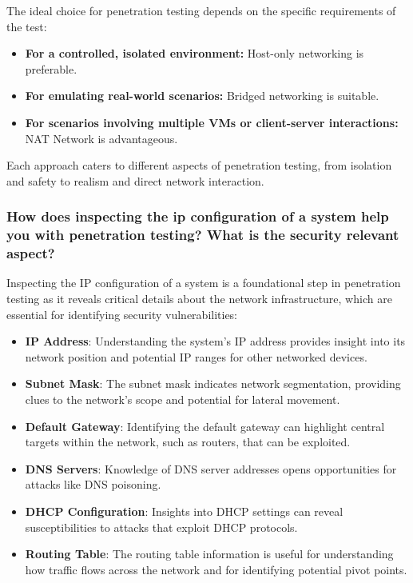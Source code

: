 The ideal choice for penetration testing depends on the specific requirements of the test:

\begin{itemize}
    \item \textbf{For a controlled, isolated environment:} Host-only networking is preferable.
    \item \textbf{For emulating real-world scenarios:} Bridged networking is suitable.
    \item \textbf{For scenarios involving multiple VMs or client-server interactions:} NAT Network is advantageous.
\end{itemize}

Each approach caters to different aspects of penetration testing, from isolation and safety to realism and direct network interaction.







\subsubsection{How does inspecting the ip configuration of a system help you with penetration testing? What is the security relevant aspect?}
Inspecting the IP configuration of a system is a foundational step in penetration testing as it reveals critical details about the network infrastructure, which are essential for identifying security vulnerabilities:

\begin{itemize}
    \item \textbf{IP Address}: Understanding the system's IP address provides insight into its network position and potential IP ranges for other networked devices.
    \item \textbf{Subnet Mask}: The subnet mask indicates network segmentation, providing clues to the network's scope and potential for lateral movement.
    \item \textbf{Default Gateway}: Identifying the default gateway can highlight central targets within the network, such as routers, that can be exploited.
    \item \textbf{DNS Servers}: Knowledge of DNS server addresses opens opportunities for attacks like DNS poisoning.
    \item \textbf{DHCP Configuration}: Insights into DHCP settings can reveal susceptibilities to attacks that exploit DHCP protocols.
    \item \textbf{Routing Table}: The routing table information is useful for understanding how traffic flows across the network and for identifying potential pivot points.
\end{itemize}

